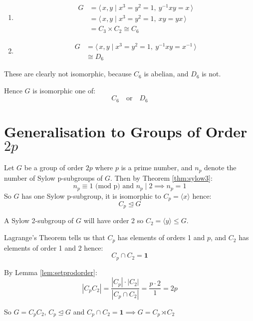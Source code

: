 \documentclass[a4paper, oneside, 12pt, final]{article}
\theoremstyle{definition}
\begin{document}
\begin{enumerate}
    \item
        \begin{equation*}
        \begin{aligned}
            G &= \langle\, x, y \mid x^3 = y^2 = 1,\ y^{-1}xy = x \,\rangle \\
            &=\langle\, x, y \mid x^3 = y^2 = 1,\ xy = yx \,\rangle \\
            &= C_3 \times C_2 \cong C_6
        \end{aligned}
        \end{equation*}

    \item
        \begin{equation*}
        \begin{aligned}
            G &= \langle\, x, y \mid x^3 = y^2 = 1,\ y^{-1}xy = x^{-1}
            \,\rangle \\
            &\cong D_6
        \end{aligned}
        \end{equation*}
\end{enumerate}

These are clearly not isomorphic, because \(C_6\) is abelian, and \(D_6\) is not.

Hence \(G\) is isomorphic one of:
\[C_6 \quad \text{or} \quad D_6\]

\section{Generalisation to Groups of Order \(2p\)}
Let \(G\) be a group of order \(2p\) where \(p\) is a prime number, and \(n_p\)
denote the number of Sylow p-subgroups of \(G\).
Then by Theorem \ref{thm:sylow3}:
\[n_p \equiv 1 \text{ (mod p) and } n_p \mid 2 \implies n_p = 1\]
So \(G\) has one Sylow p-subgroup, it is isomorphic to \(C_p = \langle x
\rangle\) hence:
\[C_p \unlhd G\]

A Sylow 2-subgroup of \(G\) will have order 2 so \(C_2 = \langle y \rangle
\leqslant G\).

Lagrange's Theorem tells us that \(C_p\) has elements of orders 1 and \(p\),
and \(C_2\) has elements of order 1 and 2 hence:
\[C_p \cap C_2 = \bm{1}\]

By Lemma \ref{lem:setprodorder}:
\[|C_p C_2| = \frac{|C_p| \cdot |C_2|}{|C_p \cap C_2|} = \frac{p \cdot 2}{1} =
2p\]

So \(G = C_p C_2\), \(C_p \unlhd G\) and \(C_p \cap C_2 = \bm{1} \implies G =
C_p \rtimes C_2\)
\end{document}
